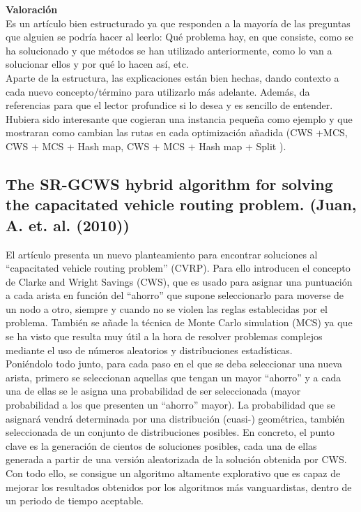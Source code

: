 \documentclass[11pt]{article} %
\begin{document}
\textbf{Valoración}\\[0.2cm]
Es un artículo bien estructurado ya que responden a la mayoría de las preguntas que alguien se podría hacer al leerlo: Qué problema hay, en que consiste, como se ha solucionado y que métodos se han utilizado anteriormente, como lo van a solucionar ellos y por qué lo hacen así, etc.\\[0.2cm]
Aparte de la estructura, las explicaciones están bien hechas, dando contexto a cada nuevo concepto/término para utilizarlo más adelante. Además, da referencias para que el lector profundice si lo desea y es sencillo de entender. Hubiera sido interesante que cogieran una instancia pequeña como ejemplo y que mostraran como cambian las rutas en cada optimización añadida (CWS +MCS, CWS + MCS + Hash map, CWS + MCS + Hash map + Split ). 

\subsection{The SR-GCWS hybrid algorithm for solving the capacitated vehicle routing problem. (Juan, A. et. al. (2010))}

El artículo presenta un nuevo planteamiento para encontrar soluciones al “capacitated vehicle routing problem” (CVRP). Para ello introducen el concepto de Clarke and Wright Savings (CWS), que es usado para asignar una puntuación a cada arista en función del “ahorro” que supone seleccionarlo para moverse de un nodo a otro, siempre y cuando no se violen las reglas establecidas por el problema. También se añade la técnica de Monte Carlo simulation (MCS) ya que se ha visto que resulta muy útil a la hora de resolver problemas complejos mediante el uso de números aleatorios y distribuciones estadísticas.\\[0.2cm]
Poniéndolo todo junto, para cada paso en el que se deba seleccionar una nueva arista, primero se seleccionan aquellas que tengan un mayor “ahorro” y a cada una de ellas se le asigna una probabilidad de ser seleccionada (mayor probabilidad a los que presenten un “ahorro” mayor). La probabilidad que se asignará vendrá determinada por una distribución (cuasi-) geométrica, también seleccionada de un conjunto de distribuciones posibles. En concreto, el punto clave es la generación de cientos de soluciones posibles, cada una de ellas generada a partir de una versión aleatorizada de la solución obtenida por CWS. Con todo ello, se consigue un algoritmo altamente explorativo que es capaz de mejorar los resultados obtenidos por los algoritmos más vanguardistas, dentro de un periodo de tiempo aceptable.\\[0.2cm]
\end{document}
